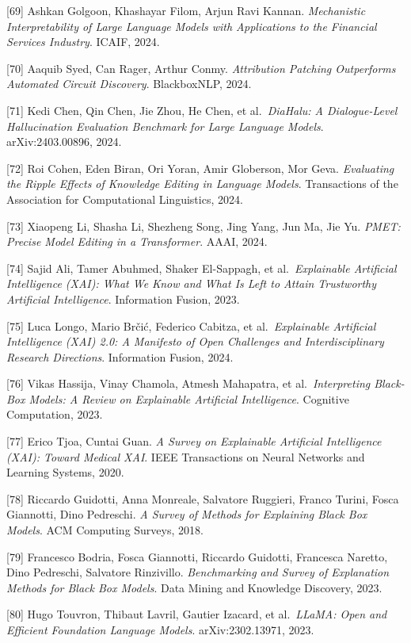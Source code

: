 {[}69{]} Ashkan Golgoon, Khashayar Filom, Arjun Ravi Kannan. \emph{Mechanistic Interpretability of Large Language Models with Applications to the Financial Services Industry}. ICAIF, 2024.

{[}70{]} Aaquib Syed, Can Rager, Arthur Conmy. \emph{Attribution Patching Outperforms Automated Circuit Discovery}. BlackboxNLP, 2024.

{[}71{]} Kedi Chen, Qin Chen, Jie Zhou, He Chen, et al.~\emph{DiaHalu: A Dialogue-Level Hallucination Evaluation Benchmark for Large Language Models}. arXiv:2403.00896, 2024.

{[}72{]} Roi Cohen, Eden Biran, Ori Yoran, Amir Globerson, Mor Geva. \emph{Evaluating the Ripple Effects of Knowledge Editing in Language Models}. Transactions of the Association for Computational Linguistics, 2024.

{[}73{]} Xiaopeng Li, Shasha Li, Shezheng Song, Jing Yang, Jun Ma, Jie Yu. \emph{PMET: Precise Model Editing in a Transformer}. AAAI, 2024.

{[}74{]} Sajid Ali, Tamer Abuhmed, Shaker El-Sappagh, et al.~\emph{Explainable Artificial Intelligence (XAI): What We Know and What Is Left to Attain Trustworthy Artificial Intelligence}. Information Fusion, 2023.

{[}75{]} Luca Longo, Mario Brčić, Federico Cabitza, et al.~\emph{Explainable Artificial Intelligence (XAI) 2.0: A Manifesto of Open Challenges and Interdisciplinary Research Directions}. Information Fusion, 2024.

{[}76{]} Vikas Hassija, Vinay Chamola, Atmesh Mahapatra, et al.~\emph{Interpreting Black-Box Models: A Review on Explainable Artificial Intelligence}. Cognitive Computation, 2023.

{[}77{]} Erico Tjoa, Cuntai Guan. \emph{A Survey on Explainable Artificial Intelligence (XAI): Toward Medical XAI}. IEEE Transactions on Neural Networks and Learning Systems, 2020.

{[}78{]} Riccardo Guidotti, Anna Monreale, Salvatore Ruggieri, Franco Turini, Fosca Giannotti, Dino Pedreschi. \emph{A Survey of Methods for Explaining Black Box Models}. ACM Computing Surveys, 2018.

{[}79{]} Francesco Bodria, Fosca Giannotti, Riccardo Guidotti, Francesca Naretto, Dino Pedreschi, Salvatore Rinzivillo. \emph{Benchmarking and Survey of Explanation Methods for Black Box Models}. Data Mining and Knowledge Discovery, 2023.

{[}80{]} Hugo Touvron, Thibaut Lavril, Gautier Izacard, et al.~\emph{LLaMA: Open and Efficient Foundation Language Models}. arXiv:2302.13971, 2023.

